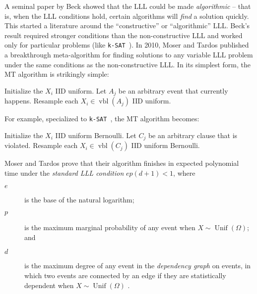 \documentclass[twocolumn]{article}
\newcommand{\ksat}{\texttt{k-SAT}~}
\newcommand{\hasDist}%
  {\sim}
\begin{document}
A seminal paper by Beck \cite{beck1991algorithmic} showed that the LLL could be made \emph{algorithmic} -- that is, when the LLL conditions hold, certain algorithms will \emph{find} a solution quickly.  This started a literature around the ``constructive'' or ``algorithmic'' LLL.  Beck's result required stronger conditions than the non-constructive LLL and worked only for particular problems (like \ksat).  In 2010, Moser and Tardos \cite{moser2009constructive,moser2010constructive} published a breakthrough meta-algorithm for finding solutions to any variable LLL problem under the same conditions as the non-constructive LLL.  In its simplest form, the MT algorithm is strikingly simple:

\begin{algorithm}[H]
\caption{The Moser-Tardos (MT) algorithm, in simple iterative form.}
\label{alg:mt}
\begin{algorithmic}
\State Initialize the $X_i$ IID uniform.
  \State Let $A_j$ be an arbitrary event that currently happens.
  \State Resample each $X_i \in \operatorname{vbl}(A_j)$ IID uniform.
\EndWhile
\end{algorithmic}
\end{algorithm}

For example, specialized to \ksat, the MT algorithm becomes:

\begin{algorithm}[H]
\caption{The Moser-Tardos algorithm, specialized to \ksat.}
\label{alg:mt-ksat}
\begin{algorithmic}[1]
\State Initialize the $X_i$ IID uniform Bernoulli.
  \State Let $C_j$ be an arbitrary clause that is violated.
  \State Resample each $X_i \in \operatorname{vbl}(C_j)$ IID uniform Bernoulli.
\EndWhile
\end{algorithmic}
\end{algorithm}

Moser and Tardos prove that their algorithm finishes in expected polynomial time under the \emph{standard LLL condition} $e p (d+1) < 1$, where
\begin{description}
  \item[$e$] is the base of the natural logarithm;
  \item[$p$] is the maximum marginal probability of any event when $X \hasDist \operatorname{Unif}(\Omega)$; and
  \item[$d$] is the maximum degree of any event in the \emph{dependency graph} on events, in which two events are connected by an edge if they are statistically dependent when $X \hasDist \operatorname{Unif}(\Omega)$ .
\end{description}
\end{document}
